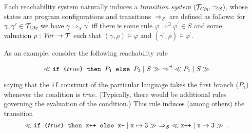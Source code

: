 Each reachability system naturally induces a \emph{transition system}
$(\mathcal{T}_{\mathit{Cfg}} , \Rightarrow_{\mathcal{S}})$, whose states are program configurations
and transitions $\Rightarrow_{\mathcal{S}}$ are defined as follows: for
$\gamma, \gamma^\prime \in \mathcal{T}_{\mathit{Cfg}}$ we have
$\gamma \Rightarrow_{\mathcal{S}} \gamma^\prime$ iff there is some rule
$\varphi \Rightarrow^\exists \varphi^\prime \in S$ and some valuation
$\rho : \mathit{Var} \to \mathcal{T}$ such that $(\gamma, \rho) \vDash \varphi$ and
$(\gamma^\prime , \rho) \vDash \varphi^\prime$.

As an example, consider the following reachability rule

\begin{equation}\label{eqn:ruleIfTrue}
    \tap{if ($true$) then $P_1$ else $P_2$}{S} \ \Rightarrow^{\exists}\ \tap{$P_1$}{S}
\end{equation}

saying that the \texttt{if} construct of the particular language takes the first branch ($P_1$)
whenever the condition is $\mathit{true}$. (Typically, there would be additional rules
governing the evaluation of the condition.)
%
This rule induces (among others) the transition
\begin{equation}\label{eqn:ruleIfTrue}
  \ll\texttt{if ($true$) then x++ else x--}\mid \mathtt{x}\mapsto 3\gg\
  \Rightarrow_{\mathcal{S}}\  \ll\texttt{x++}\mid \mathtt{x}\mapsto 3\gg \,.
\end{equation}






